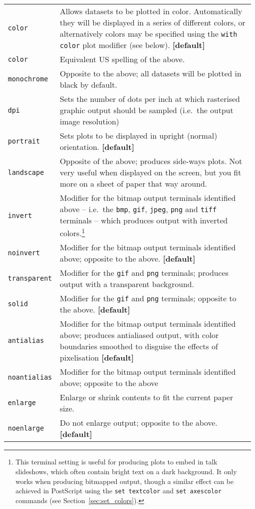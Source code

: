 \begin{longtable}{p{3cm}p{9cm}}
{\tt color} & Allows datasets to be plotted in color. Automatically they will be displayed in a series of different colors, or alternatively colors may be specified using the {\tt with color} plot modifier (see below). {\bf [default]}\index{color output}\\
{\tt color} & Equivalent US spelling of the above. \\
{\tt monochrome} & Opposite to the above; all datasets will be plotted in black by default.\index{monochrome output}\\
{\tt dpi} & Sets the number of dots per inch at which rasterised graphic output should be sampled (i.e.\ the output image resolution)\\
{\tt portrait} & Sets plots to be displayed in upright (normal) orientation. {\bf [default]}\index{portrait orientation}\\
{\tt landscape} & Opposite of the above; produces side-ways plots. Not very useful when displayed on the screen, but you fit more on a sheet of paper that way around.\index{landscape orientation}\\
{\tt invert} & Modifier for the bitmap output terminals identified above -- i.e.\ the {\tt bmp}, {\tt gif}, {\tt jpeg}, {\tt png} and {\tt tiff} terminals -- which produces output with inverted colors.\footnote{This terminal setting is useful for producing plots to embed in talk slideshows, which often contain bright text on a dark background. It only works when producing bitmapped output, though a similar effect can be achieved in PostScript using the {\tt set textcolor} and {\tt set axescolor} commands (see Section~\ref{sec:set_colors}).}\index{colors!inverting}\\
{\tt noinvert} & Modifier for the bitmap output terminals identified above; opposite to the above. {\bf [default]}\\
{\tt transparent} & Modifier for the {\tt gif} and {\tt png} terminals; produces output with a transparent background.\index{transparent terminal}\index{gif output!transparency}\index{png output!transparency}\\
{\tt solid} & Modifier for the {\tt gif} and {\tt png} terminals; opposite to the above. {\bf [default]}\\
{\tt antialias} & Modifier for the bitmap output terminals identified above; produces antialiased output, with color boundaries smoothed to disguise the effects of pixelisation {\bf [default]}\\
{\tt noantialias} & Modifier for the bitmap output terminals identified above; opposite to the above\\
{\tt enlarge} & Enlarge or shrink contents to fit the current paper size.\index{enlarging output}\\
{\tt noenlarge} & Do not enlarge output; opposite to the above. {\bf [default]}\\
\end{longtable}

